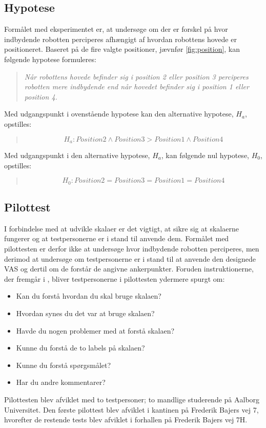 \subsection*{Hypotese}
\label{Hypotese}
%
Formålet med eksperimentet er, at undersøge om der er forskel på hvor indbydende robotten perciperes afhængigt af hvordan robottens hovede er positioneret. Baseret på de fire valgte positioner, jævnfør \autoref{fig:position}, kan følgende hypotese formuleres: 
%
\begin{quotation}
\noindent
  \textit{Når robottens hovede befinder sig i position 2 eller position 3 perciperes robotten mere indbydende end når hovedet befinder sig i position 1 eller position 4.}
\end{quotation}
\noindent
%
Med udgangspunkt i ovenstående hypotese kan den alternative hypotese, $H_a$, opstilles:
%
\begin{quotation}
\noindent
\begin{equation}
  H_a: Position 2 \wedge Position 3 > Position 1 \wedge Position 4
\end{equation}  
\end{quotation}
\noindent
%
Med udgangspunkt i den alternative hypotese, $H_a$, kan følgende nul hypotese, $H_0$, opstilles: 
%
%
\begin{quotation}
\noindent
\begin{equation}
  H_0: Position 2 = Position 3 = Position 1 = Position 4
\end{equation}  
\end{quotation}
\noindent
%
\vfill

\subsection*{Pilottest}
\label{Pilottest}
%
I forbindelse med at udvikle skalaer er det vigtigt, at sikre sig at skalaerne fungerer og at testpersonerne er i stand til anvende dem. Formålet med pilottesten er derfor ikke at undersøge hvor indbydende robotten perciperes, men derimod at undersøge om testpersonerne er i stand til at anvende den designede VAS og dertil om de forstår de angivne ankerpunkter. \blankline
%
Foruden instruktionerne, der fremgår i , bliver testpersonerne i pilottesten ydermere spurgt om:\blankline   
%
\begin{itemize}
	\item Kan du forstå hvordan du skal bruge skalaen?
	\item Hvordan synes du det var at bruge skalaen?
	\item Havde du nogen problemer med at forstå skalaen?
	\item Kunne du forstå de to labels på skalaen?
	\item Kunne du forstå spørgsmålet?
	\item Har du andre kommentarer?
\end{itemize} 
%
Pilottesten blev afviklet med to testpersoner; to mandlige studerende på Aalborg Universitet. Den første pilottest blev afviklet i kantinen på Frederik Bajers vej 7, hvorefter de restende tests blev afviklet i forhallen på Frederik Bajers vej 7H. 
%
